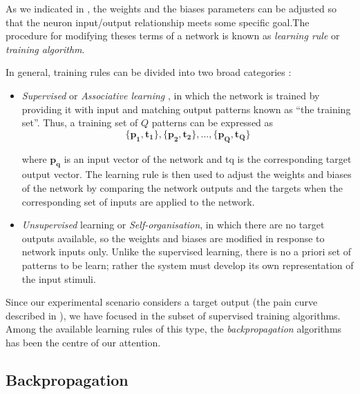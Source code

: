
\label{sec:learningrules}

As we indicated in , the weights and the biases parameters can be adjusted so that the neuron input/output relationship meets some specific goal.The procedure for modifying theses terms of a network is known as \emph{learning rule} or \emph{training algorithm}. 

In general, training rules can be divided into two broad categories \cite{demuth2008neural}:
\begin{itemize}
\item \emph{Supervised} or \emph{Associative learning}
, in which the network is trained by providing it with input and matching output patterns known as ``the training set''. 
Thus, a training set of $Q$ patterns can be expressed as
\begin{equation}
\{\mathbf{p_{1}} , \mathbf{t_{1}} \}, \{\mathbf{p_{2}} , \mathbf{t_{2}}\}, ...,
 \{\mathbf{p_{Q}} , \mathbf{t_{Q}} \}
\label{eq:trainingset}
\end{equation}

where $\mathbf{p_{q}}$ is an input vector of the network and tq is the corresponding target
output vector. The learning rule is then used to adjust the weights and biases of the network by comparing the network outputs and the targets when the corresponding set of inputs are applied to the network.

\item \emph{Unsupervised} learning or \emph{Self-organisation}, in which there are no target outputs available, so the weights and biases are modified in response to network inputs only. 
Unlike the supervised learning, there is no a priori set of patterns to be learn;
rather the system must develop its own representation of the input stimuli.
\end{itemize}

Since our experimental scenario considers a target output (the pain curve described in ), we have focused in the subset of supervised training algorithms. 
Among the available learning rules of this type, the \emph{backpropagation} algorithms has been the centre of our attention. 

\subsection{Backpropagation}
